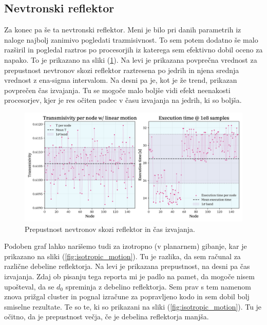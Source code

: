 \documentclass[a4paper]{article}
\begin{document}
\subsection{Nevtronski reflektor}
Za konec pa še ta nevtronski reflektor. Meni je bilo pri danih parametrih iz naloge najbolj zanimivo pogledati
trazmisivnost. To sem potem dodatno še malo razširil in pogledal raztros po procesorjih iz katerega sem efektivno dobil 
oceno za napako. To je prikazano na sliki (\ref{fig:linear_motion}). Na levi je prikazana povprečna vrednost za prepustnost
nevtronov skozi reflektor raztresena po jedrih in njena srednja vrednost z ena-sigma intervalom. Na desni pa je, kot je 
že trend, prikazan povprečen čas izvajanja. Tu se mogoče malo boljše vidi efekt neenakosti procesorjev, kjer je 
res očiten padec v času izvajanja na jedrih, ki so boljša. \\

\begin{figure}[H]
    \centering
    \includegraphics[width=\textwidth]{../NeutronReflector/Images/linear_motion.png}
    \caption{Prepustnost nevtronov skozi reflektor in čas izvajanja.}
    \label{fig:linear_motion}
\end{figure}

Podoben graf lahko narišemo tudi za izotropno (v planarnem) gibanje, kar je prikazano na sliki (\ref{fig:isotropic_motion}).
Tu je razlika, da sem računal za različne debeline reflektorja. Na levi je prikazana prepustnost, na desni pa čas izvajanja.
Zdaj ob pisanju tega reporta mi je padlo na pamet, da mogoče nisem upošteval, da se $d_0$ spreminja z debelino reflektorja. 
Sem prav s tem namenom znova prižgal cluster in pognal izračune za popravljeno kodo in sem dobil bolj smiselne rezultate. Te 
so te, ki so prikazani na sliki (\ref{fig:isotropic_motion}). Tu je očitno, da je prepustnost večja, če je debelina reflektorja
manjša. \\
\end{document}
